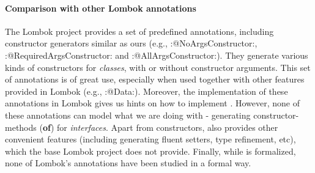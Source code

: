 \paragraph{Comparison with other Lombok annotations}
The Lombok project provides a set of predefined annotations, including constructor
generators similar as ours (e.g., \Q:@NoArgsConstructor:,
\Q:@RequiredArgsConstructor: and \Q:@AllArgsConstructor:). They
generate various kinds of constructors for \emph{classes}, with or without
constructor arguments. This set of annotations is of great use, especially when
used together with other features provided in Lombok (e.g.,
\Q:@Data:). Moreover, the implementation of these annotations in Lombok
gives us hints on how to implement \mixin. However, none of these annotations
can model what we are doing with \mixin - generating constructor-methods
(\textbf{of}) for \emph{interfaces}. Apart from constructors, \mixin also
provides other convenient features (including generating fluent setters, type
refinement, etc), which the base Lombok project does not provide.
Finally, while \mixin is formalized, none of Lombok's annotations have been
studied in a formal way.


